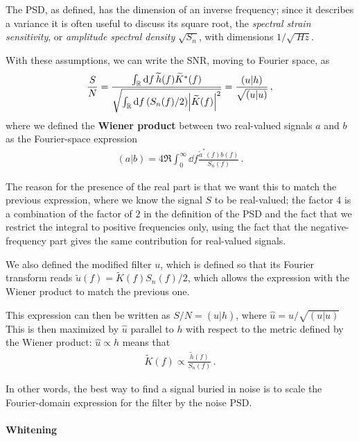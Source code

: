 \documentclass[main.tex]{subfiles}
\begin{document}
The \ac{PSD}, as defined, has the dimension of an inverse frequency; since it describes a variance it is often useful to discuss its square root, the \emph{spectral strain sensitivity}, or \emph{amplitude spectral density} \(\sqrt{S_n}\), with dimensions \(1/ \sqrt{ \SI{}{Hz}}\). 

With these assumptions, we can write the \ac{SNR}, moving to Fourier space, as \cite[eq.\ 7.45]{maggioreGravitationalWavesVolume2007}
%
\begin{align} \label{eq:snr}
\frac{S}{N} = \frac{\int_{\mathbb{R}} \dd{f} \widetilde{h}(f) \widetilde{K}^{*}(f) }{\sqrt{\int_{\mathbb{R}} \dd{f} (S_n(f) / 2) \abs{\widetilde{K}(f)}^2}} = \frac{(u|h)}{\sqrt{(u|u)}}
\,,
\end{align}
%
where we defined the \textbf{Wiener product} between two real-valued signals \(a\) and \(b\) as the Fourier-space expression \cites{finnDetectionMeasurementGravitational1992}[eq.\ 7.46]{maggioreGravitationalWavesVolume2007}
%
\begin{align}
(a | b) = 4 \Re \int_{0}^{\infty } \dd{f} \frac{ \widetilde{a}^{*} (f) b(f)}{S_n(f)}
\,.
\end{align}

The reason for the presence of the real part is that we want this to match the previous expression, where we know the signal \(S\) to be real-valued; the factor 4 is a combination of the factor of \(2\) in the definition of the \ac{PSD} and the fact that we restrict the integral to positive frequencies only, using the fact that the negative-frequency part gives the same contribution for real-valued signals.

We also defined the modified filter \(u\), which is defined so that its Fourier transform reads \(\widetilde{u}(f) = \widetilde{K}(f) S_n(f) / 2\), which allows the expression with the Wiener product to match the previous one.

This expression can then be written as \(S/N = (\hat{u} | h)\), where \(\hat{u} = u / \sqrt{(u|u)}\) This is then maximized by \(\hat{u}\) parallel to \(h\) with respect to the metric defined by the Wiener product: \(\hat{u} \propto h\) means that 
%
\begin{align}
\widetilde{K}(f) \propto \frac{\widetilde{h}(f)}{S_n(f)}
\,.
\end{align}

In other words, the best way to find a signal buried in noise is to scale the Fourier-domain expression for the filter by the noise \ac{PSD}. 

\paragraph{Whitening}
\end{document}
